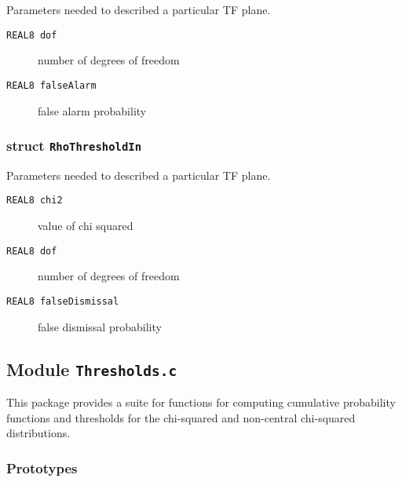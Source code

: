 \noindent Parameters needed to described a particular TF plane.

\begin{description}
\item[\texttt{REAL8     dof}]   number of degrees of freedom 
\item[\texttt{REAL8     falseAlarm}]  false alarm probability 
\end{description}

\subsubsection*{struct \texttt{RhoThresholdIn}}

\noindent Parameters needed to described a particular TF plane.

\begin{description}
\item[\texttt{REAL8     chi2}]   value of chi squared  
\item[\texttt{REAL8     dof}]  number of degrees of freedom
\item[\texttt{REAL8     falseDismissal}] false dismissal probability 
\end{description}

\newpage
\subsection{Module \texttt{Thresholds.c}}
\label{ss:Thresholds.c}

This package provides a suite for functions for computing cumulative
probability functions and thresholds for the chi-squared and
non-central chi-squared distributions.

\subsubsection*{Prototypes}
\vspace{0.1in}






